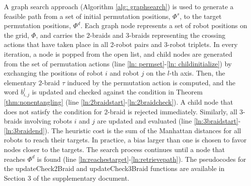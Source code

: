 \documentclass[conference]{IEEEtran}
\newcommand*{\btau}{\tau} %
\newcommand*{\word}{b} %
\newcommand*{\dummyl}{l}
\newcommand*{\permposset}{\Phi}
\begin{document}
A graph search approach (Algorithm \ref{alg: graphsearch}) is used to generate a feasible path from a set of initial permutation positions, $\permposset^s$, to the target permutation positions, $\permposset^d$.
Each graph node represents a set of robot positions on the grid, $\permposset$, and carries the $2$-braids and $3$-braids representing the crossing actions that have taken place in all 2-robot pairs and 3-robot triplets.
In every iteration, a node is popped from the open list, and child nodes are generated from the set of permutation actions (line \ref{ln: permset}-\ref{ln: childinitialize}) by exchanging the positions of robot $i$ and robot $j$ on the $\dummyl$-th axis.
Then, the elementary $2$-braid $\btau$ induced by the permutation action is computed, and the word $\word_{i,j}^\dummyl$ is updated and checked against the condition in Theorem \ref{thm:nonentangling} (line \ref{ln:2braidstart}-\ref{ln:2braidcheck}).
A child node that does not satisfy the condition for $2$-braid is rejected immediately.
Similarly, all $3$-braids involving robots $i$ and $j$ are updated and evaluated (line \ref{ln:3braidstart}-\ref{ln:3braidend}).
The heuristic cost is the sum of the Manhattan distances for all robots to reach their targets.
In practice, a bias larger than one is chosen to favor nodes closer to the targets.
The search process continues until a node that reaches $\permposset^d$ is found (line \ref{ln:reachestarget}-\ref{ln:retrievepath}).
The pseudocodes for the updateCheck2Braid and updateCheck3Braid functions are available in Section 3 of the supplementary document.
\end{document}
